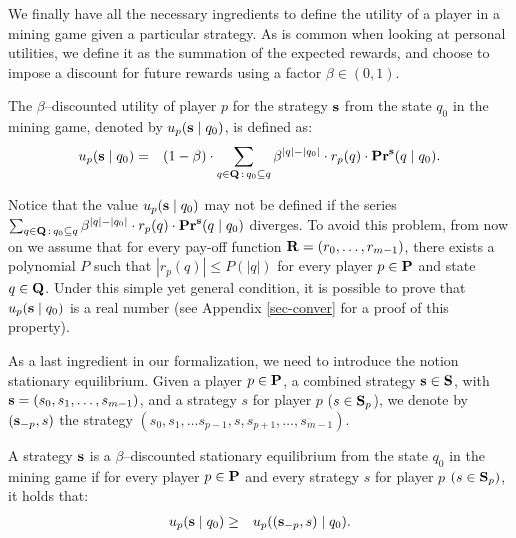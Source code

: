 We finally have all the necessary ingredients to define the utility of a player in a mining game given a particular strategy. As is common
when looking at personal utilities, we define it as the summation of the expected rewards, and choose
to impose a discount for future rewards using a factor $\beta \in (0,1)$.

\begin{mydef}
\label{def-utility}
The $\beta$--discounted utility of player $p$ for the strategy $\mathbf{s}$ from the state $q_0$ in
the mining game, denoted by $u_p(\mathbf{s} \mid q_0)$, is defined as:
\begin{eqnarray*}
u_p(\mathbf{s} \mid q_0) & = & (1 - \beta) \cdot  \sum_{q \in \mathbf{Q} \,:\, q_0 \subseteq q} \beta^{|q|-|q_0|} \cdot  r_p(q) \cdot \mathbf{Pr}^{\mathbf{s}}(q \mid q_0).
\end{eqnarray*}
\end{mydef}
Notice that the value $u_p(\mathbf{s} \mid q_0)$ may not be defined if the series $\sum_{q \in \mathbf{Q} \,:\, q_0 \subseteq q} \beta^{|q|-|q_0|} \cdot  r_p(q) \cdot \mathbf{Pr}^{\mathbf{s}}(q \mid q_0)$ diverges. To avoid this problem, from now on we assume that for every pay-off function $\mathbf{R} = (r_0, \ldots, r_{m-1})$, there exists a polynomial $P$ such that $|r_p(q)| \leq P(|q|)$ for every player $p \in \mathbf{P}$ and state $q \in \mathbf{Q}$. Under this simple yet general condition, it is possible to prove that $u_p(\mathbf{s} \mid q_0)$ is a real number (see Appendix \ref{sec-conver} for a proof of this property).

As a last ingredient in our formalization, we need to introduce the notion stationary equilibrium.
Given a player $p \in \mathbf{P}$, a combined strategy $\mathbf{s} \in \mathbf{S}$, with $\mathbf{s} = (s_0,s_1, \ldots, s_{m-1})$, and a strategy $s$ for player $p$ ($s \in \mathbf{S}_p$), we denote by $(\mathbf{s}_{-p}, s)$ the strategy $(s_0, s_1, \ldots s_{p-1},s,s_{p+1}, \ldots, s_{m-1})$.
\begin{mydef}
A strategy $\mathbf{s}$ is a $\beta$--discounted stationary equilibrium from the state $q_0$ in  the %
mining game if for every player $p \in \mathbf{P}$ and every strategy $s$ for player $p$ $(s \in\mathbf{S}_p)$, it holds that:
\begin{eqnarray*}u_p(\mathbf{s} \mid q_0)  & \geq  & u_p ((\mathbf{s}_{-p},s) \mid q_0).
\end{eqnarray*}
\end{mydef}

